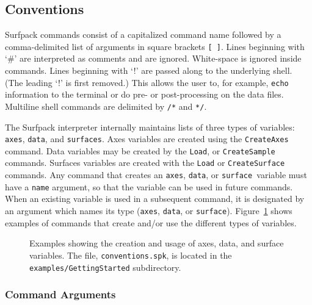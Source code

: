 \documentclass{article}
\begin{document}
\subsection{Conventions}\label{sec:conventions}
Surfpack commands consist of a capitalized command name followed by a
comma-delimited list of arguments in square brackets \texttt{[ ]}.  Lines beginning with  `\#' are interpreted as comments and are ignored.  White-space is ignored inside commands. Lines beginning with `!' are passed along to the underlying shell.  (The
leading `!' is first removed.)  This allows the user to, for example, \texttt{echo}
information to the terminal or do pre- or post-processing on the data files.
Multiline shell commands are delimited by \texttt{/*} and \texttt{*/}.

The Surfpack interpreter internally maintains lists of three types of variables: \texttt{axes},
\texttt{data}, and \texttt{surfaces}.  Axes variables are created using the \texttt{CreateAxes}
command.  Data variables may be created by the \texttt{Load}, or \texttt{CreateSample}
commands.  Surfaces variables are created with the \texttt{Load} or
\texttt{CreateSurface} commands.  Any command that creates an \texttt{axes}, \texttt{data}, or \texttt{surface
}variable must have a \texttt{name} argument, so that the variable can be used in 
future commands.  When an existing variable is
used in a subsequent command, it is designated by an argument which names its
type (\texttt{axes}, \texttt{data}, or \texttt{surface}).  Figure~\ref{fig:conventions} shows examples of commands that create and/or use the different types of variables. 

\begin{figure}[htbp]
  \centering
  \begin{bigbox}
	\begin{small}
 	\end{small}
  \end{bigbox}
  \caption{Examples showing the creation and usage of axes, data, and surface variables.  The file, \texttt{conventions.spk}, is located in the \texttt{examples/GettingStarted} subdirectory.}
   \label{fig:conventions}
\end{figure}

\subsubsection{Command Arguments}\label{sec:arguments}
\end{document}
